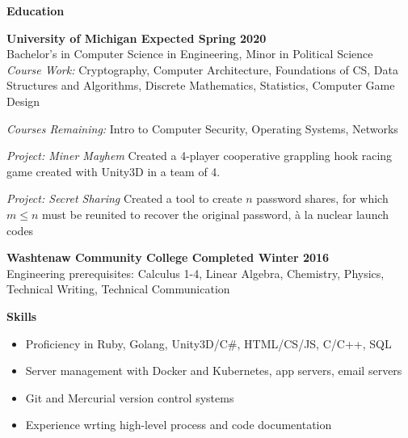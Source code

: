 \documentclass[10pt,letter]{article}
\begin{document}
\vspace{0.25in}
{\LARGE\textbf{Education}}
\vspace{0.15in}

\textbf{University of Michigan \hfill  Expected Spring 2020} \\
Bachelor's in Computer Science in Engineering, Minor in Political Science \\
\textit{Course Work: } Cryptography, Computer Architecture, Foundations of CS, Data Structures and Algorithms, Discrete Mathematics, Statistics, Computer Game Design

\textit{Courses Remaining: } Intro to Computer Security, Operating Systems, Networks

\textit{Project: Miner Mayhem } Created a 4-player cooperative grappling hook racing game created with Unity3D in a team of 4.

\textit{Project: Secret Sharing } Created a tool to create $n$ password shares, for which $m \leq n$ must be reunited to recover the original password, à la nuclear launch codes

\vspace{0.25in}

\textbf{Washtenaw Community College \hfill  Completed Winter 2016} \\
Engineering prerequisites: Calculus 1-4, Linear Algebra, Chemistry, Physics, Technical Writing, Technical Communication

\vspace{0.25in}

{\LARGE\textbf{Skills}}

\begin{itemize}[leftmargin=1em]
  \setlength\itemsep{-0.3em}
  \item{Proficiency in Ruby, Golang, Unity3D/C\#, HTML/CS/JS, C/C++, SQL}
  \item{Server management with Docker and Kubernetes, app servers, email servers}
  \item{Git and Mercurial version control systems}
  \item{Experience wrting high-level process and code documentation}
\end{itemize}
\end{document}
